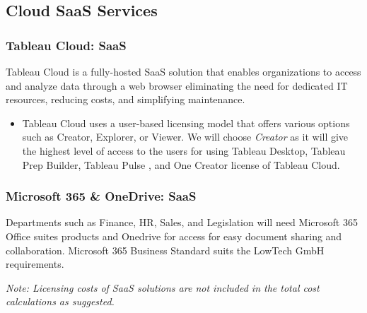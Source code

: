 \documentclass{llncs}
\begin{document}
\subsection{Cloud SaaS Services} 

\subsubsection{Tableau Cloud: SaaS} \leavevmode\newline
Tableau Cloud is a fully-hosted SaaS 
solution that enables organizations to access and analyze data through a web browser eliminating the need for dedicated IT resources, reducing costs, and simplifying maintenance.
\begin{itemize}
    \item Tableau Cloud uses a user-based licensing model that offers various options such as Creator, Explorer, or Viewer. We will choose \textit{Creator} as it will give the highest level of access to the users for using Tableau Desktop, Tableau Prep Builder, Tableau Pulse
 , and One Creator license of Tableau Cloud. 
\end{itemize}

\subsubsection{Microsoft 365 \& OneDrive: SaaS} \leavevmode\newline
Departments such as Finance, HR, Sales, and Legislation will need Microsoft 365 Office suites products and Onedrive for access for easy document sharing
and collaboration. Microsoft 365 Business Standard suits the LowTech GmbH requirements.

\textit{Note: Licensing costs of SaaS solutions are not included in the total cost calculations as suggested.}
\end{document}
